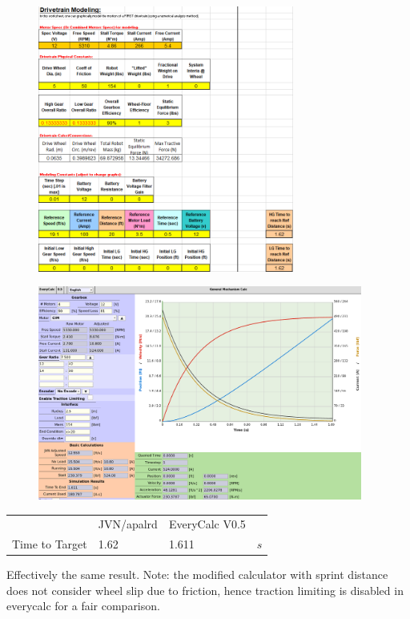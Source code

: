 \documentclass[10pt,letterpaper]{article}
\begin{document}
	\begin{figure}[H]
		\includegraphics[width=0.75\textwidth]{validation/mechanism_JVN_apalrd_C.png}
	\end{figure}

	\begin{figure}[H]
		\includegraphics[width=0.95\textwidth]{validation/mechanism_EC_C.png}
	\end{figure}

	\begin{table}[H]
	\begin{tabular}{llll}
	                & JVN/apalrd & EveryCalc V0.5 & \\ \cline{1-4} 
	Time to Target  & 1.62  & 1.611 & $s$
	\end{tabular}
	\end{table}

	Effectively the same result. Note: the modified calculator with sprint distance does not consider wheel slip due to friction, hence traction limiting is disabled in everycalc for a fair comparison.
\end{document}
